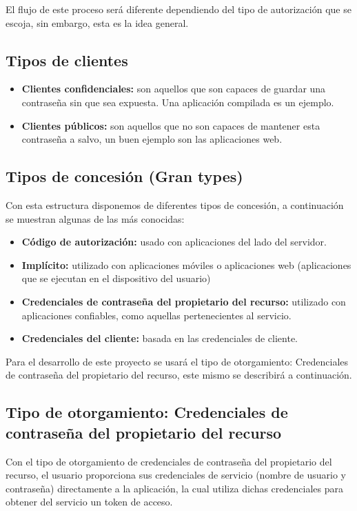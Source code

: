 El flujo de este proceso será diferente dependiendo del tipo de autorización que se escoja, sin embargo, esta es la idea general. \cite{Anicas2018}

\subsection{Tipos de clientes}

\begin{itemize}
    \item \textbf{Clientes confidenciales: }son aquellos que son capaces de guardar una contraseña sin que sea expuesta. Una aplicación compilada es un ejemplo.
    \item \textbf{Clientes públicos: }son aquellos que no son capaces de mantener esta contraseña a salvo, un buen ejemplo son las aplicaciones web.
\end{itemize}

\subsection{Tipos de concesión (Gran types)}
Con esta estructura disponemos de diferentes tipos de concesión, a continuación se muestran algunas de las más conocidas:
\begin{itemize}
    \item \textbf{Código de autorización: }usado con aplicaciones del lado del servidor.
    \item \textbf{Implícito: }utilizado con aplicaciones móviles o aplicaciones web (aplicaciones que se ejecutan en el dispositivo del usuario)
    \item \textbf{Credenciales de contraseña del propietario del recurso: }utilizado con aplicaciones confiables, como aquellas pertenecientes al servicio.
    \item \textbf{Credenciales del cliente: }basada en las credenciales de cliente.
\end{itemize}

Para el desarrollo de este proyecto se usará el tipo de otorgamiento: Credenciales de contraseña del propietario del recurso, este mismo se describirá a continuación.

\subsection{Tipo de otorgamiento: Credenciales de contraseña del propietario del recurso}
Con el tipo de otorgamiento de credenciales de contraseña del propietario del recurso, el usuario proporciona sus credenciales de servicio (nombre de usuario y contraseña) directamente a la aplicación, la cual utiliza dichas credenciales para obtener del servicio un token de acceso. \cite{Anicas2018}

